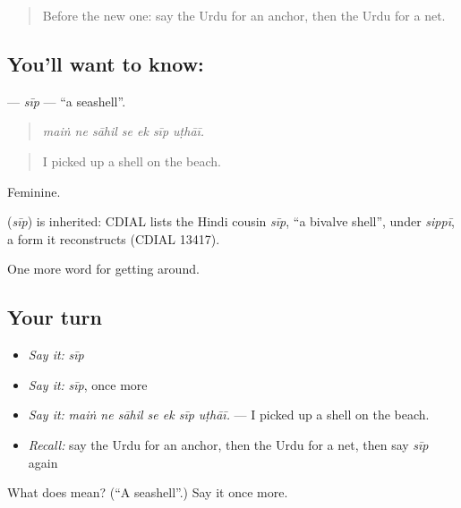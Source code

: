 \begin{quote}
Before the new one: say the Urdu for an anchor, then the Urdu for a net.
\end{quote}

\subsection*{You'll want to know: }
\textbf{} — \emph{sīp} — \textquotedblleft{}a seashell\textquotedblright{}.

\begin{quote}
      
\end{quote}

\begin{quote}
\emph{maiṅ ne sāhil se ek sīp uṭhāī.}
\end{quote}

\begin{quote}
I picked up a shell on the beach.
\end{quote}

Feminine.

\begin{cousinweb}
\textbf{} (\emph{sīp}) is inherited: CDIAL lists the Hindi cousin \emph{sīp}, \textquotedblleft{}a bivalve shell\textquotedblright{}, under \emph{sippī}, a form it reconstructs (CDIAL 13417).
\end{cousinweb}

\begin{grammarlens}[title={What you've built}]
One more word for getting around.
\end{grammarlens}

\subsection*{Your turn}
\begin{itemize}
\raggedright
  \item \emph{Say it:} \emph{sīp}
  \item \emph{Say it:} \emph{sīp}, once more
  \item \emph{Say it:} \emph{maiṅ ne sāhil se ek sīp uṭhāī.} — I picked up a shell on the beach.
  \item \emph{Recall:} say the Urdu for an anchor, then the Urdu for a net, then say \emph{sīp} again
\end{itemize}

\begin{tcolorbox}[breakable,colback=teal!4,colframe=teal!35!black,title={Before you move on}]
What does  mean? (\textquotedblleft{}A seashell\textquotedblright{}.) Say it once more.
\end{tcolorbox}
